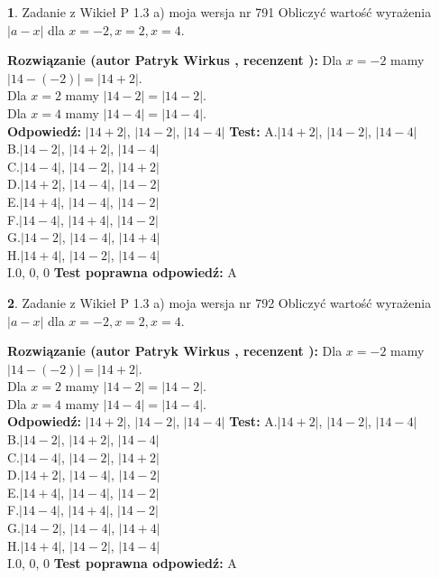 \documentclass[12pt, a4paper]{article}
\theoremstyle{definition} %
\newtheorem{zad}{}
\newcommand{\zadStart}[1]{\begin{zad}#1\newline}
\newcommand{\zadStop}{\end{zad}}
\newcommand{\rozwStart}[2]{\noindent \textbf{Rozwiązanie (autor #1 , recenzent #2): }\newline}
\newcommand{\rozwStop}{\newline}
\newcommand{\odpStart}{\noindent \textbf{Odpowiedź:}\newline}
\newcommand{\odpStop}{\newline}
\newcommand{\testStart}{\noindent \textbf{Test:}\newline}
\newcommand{\testStop}{\newline}
\newcommand{\kluczStart}{\noindent \textbf{Test poprawna odpowiedź:}\newline}
\newcommand{\kluczStop}{\newline}
\begin{document}
\zadStart{Zadanie z Wikieł P 1.3 a) moja wersja nr 791}
Obliczyć wartość wyrażenia $|a - x|$ dla $x=-2,x=2,x=4$.
\zadStop
\rozwStart{Patryk Wirkus}{}
Dla $x = -2$ mamy $|14 - (-2)| = |14 + 2|$.\\
Dla $x = 2$ mamy $|14 - 2| = |14 - 2|$.\\
Dla $x = 4$ mamy $|14 - 4| = |14 - 4|$.\\
\rozwStop
\odpStart
$|14 + 2|$, $|14 - 2|$, $|14 - 4|$
\odpStop
\testStart
A.$|14 + 2|$, $|14 - 2|$, $|14 - 4|$\\
B.$|14 - 2|$, $|14 + 2|$, $|14 - 4|$\\
C.$|14 - 4|$, $|14 - 2|$, $|14 + 2|$\\
D.$|14 + 2|$, $|14 - 4|$, $|14 - 2|$\\
E.$|14 + 4|$, $|14 - 4|$, $|14 - 2|$\\
F.$|14 - 4|$, $|14 + 4|$, $|14 - 2|$\\
G.$|14 - 2|$, $|14 - 4|$, $|14 + 4|$\\
H.$|14 + 4|$, $|14 - 2|$, $|14 - 4|$\\
I.$0$, $0$, $0$
\testStop
\kluczStart
A
\kluczStop



\zadStart{Zadanie z Wikieł P 1.3 a) moja wersja nr 792}
Obliczyć wartość wyrażenia $|a - x|$ dla $x=-2,x=2,x=4$.
\zadStop
\rozwStart{Patryk Wirkus}{}
Dla $x = -2$ mamy $|14 - (-2)| = |14 + 2|$.\\
Dla $x = 2$ mamy $|14 - 2| = |14 - 2|$.\\
Dla $x = 4$ mamy $|14 - 4| = |14 - 4|$.\\
\rozwStop
\odpStart
$|14 + 2|$, $|14 - 2|$, $|14 - 4|$
\odpStop
\testStart
A.$|14 + 2|$, $|14 - 2|$, $|14 - 4|$\\
B.$|14 - 2|$, $|14 + 2|$, $|14 - 4|$\\
C.$|14 - 4|$, $|14 - 2|$, $|14 + 2|$\\
D.$|14 + 2|$, $|14 - 4|$, $|14 - 2|$\\
E.$|14 + 4|$, $|14 - 4|$, $|14 - 2|$\\
F.$|14 - 4|$, $|14 + 4|$, $|14 - 2|$\\
G.$|14 - 2|$, $|14 - 4|$, $|14 + 4|$\\
H.$|14 + 4|$, $|14 - 2|$, $|14 - 4|$\\
I.$0$, $0$, $0$
\testStop
\kluczStart
A
\kluczStop
\end{document}
